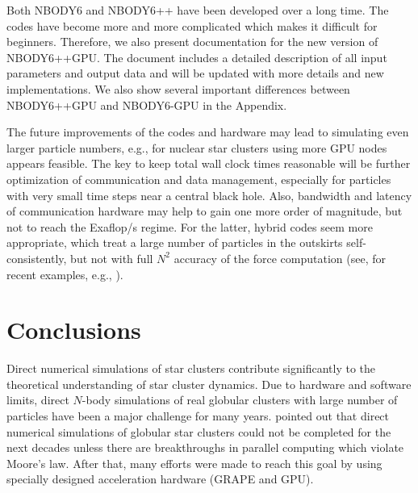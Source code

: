\documentclass[usenatbib,aas_macros]{mn2e}
\def\nbody{NBODY6 }
\def\nbodypp{NBODY6++ }
\def\nbodyppgpu{NBODY6++GPU }
\def\nbodygpu{NBODY6-GPU }
\def\nb{$N$-body }
\begin{document}
Both \nbody and \nbodypp have been developed over a long time. 
The codes have become more and more complicated which makes it difficult for beginners. 
Therefore, we also present documentation for the new version of NBODY6++GPU. 
The document includes a detailed description of all input parameters and output data and will be updated with more details and new implementations.
We also show several important differences between \nbodyppgpu and \nbodygpu in the Appendix.

The future improvements of the codes and hardware may lead to simulating even larger particle numbers, e.g., for nuclear star clusters using more GPU nodes appears feasible. 
The key to keep total wall clock times reasonable will be further optimization of communication and data management, especially for particles with very small time steps near a central black hole. 
Also, bandwidth and latency of communication hardware may help to gain one more order of magnitude, but not to reach the Exaflop/s regime. 
For the latter, hybrid codes seem more appropriate, which treat a large number of particles in the outskirts self-consistently, but not with full $N^2$ accuracy of the force computation (see, for recent examples, e.g., \citealp{Meiron2014,Karl2015}).

\section{Conclusions}
\label{sec:conclusion}
Direct numerical simulations of star clusters contribute significantly to the theoretical understanding of star cluster dynamics.
Due to hardware and software limits, direct \nb simulations of real globular clusters with large number of particles have been a major challenge for many years.
\cite{Sugimoto1990} pointed out that direct numerical simulations of globular star clusters could not be completed for the next decades unless there are breakthroughs in parallel computing which violate Moore's law.
After that, many efforts were made to reach this goal by using specially designed acceleration hardware (GRAPE and GPU).
\end{document}
